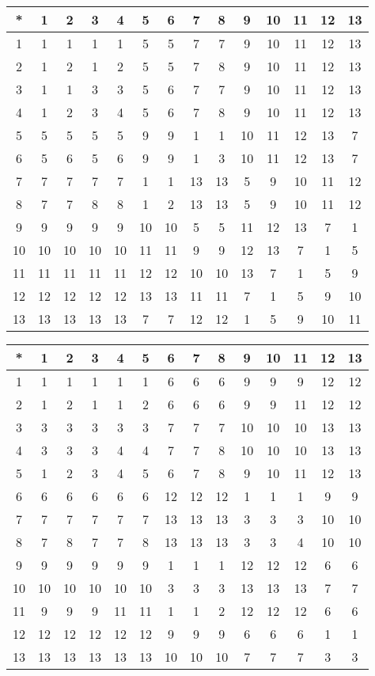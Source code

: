 \begin{tabular}[t]{c|ccccccccccccc}
*&1&2&3&4&5&6&7&8&9&10&11&12&13 \\ \hline
    1&1&1&1&1&5&5&7&7&9&10&11&12&13 \\
    2&1&2&1&2&5&5&7&8&9&10&11&12&13 \\
    3&1&1&3&3&5&6&7&7&9&10&11&12&13 \\
    4&1&2&3&4&5&6&7&8&9&10&11&12&13 \\
    5&5&5&5&5&9&9&1&1&10&11&12&13&7 \\
    6&5&6&5&6&9&9&1&3&10&11&12&13&7 \\
    7&7&7&7&7&1&1&13&13&5&9&10&11&12 \\
    8&7&7&8&8&1&2&13&13&5&9&10&11&12 \\
    9&9&9&9&9&10&10&5&5&11&12&13&7&1 \\
    10&10&10&10&10&11&11&9&9&12&13&7&1&5 \\
    11&11&11&11&11&12&12&10&10&13&7&1&5&9 \\
    12&12&12&12&12&13&13&11&11&7&1&5&9&10 \\
    13&13&13&13&13&7&7&12&12&1&5&9&10&11 
\end{tabular}


\begin{tabular}[t]{c|ccccccccccccc}
*&1&2&3&4&5&6&7&8&9&10&11&12&13 \\ \hline
    1&1&1&1&1&1&6&6&6&9&9&9&12&12 \\
    2&1&2&1&1&2&6&6&6&9&9&11&12&12 \\
    3&3&3&3&3&3&7&7&7&10&10&10&13&13 \\
    4&3&3&3&4&4&7&7&8&10&10&10&13&13 \\
    5&1&2&3&4&5&6&7&8&9&10&11&12&13 \\
    6&6&6&6&6&6&12&12&12&1&1&1&9&9 \\
    7&7&7&7&7&7&13&13&13&3&3&3&10&10 \\
    8&7&8&7&7&8&13&13&13&3&3&4&10&10 \\
    9&9&9&9&9&9&1&1&1&12&12&12&6&6 \\
    10&10&10&10&10&10&3&3&3&13&13&13&7&7 \\
    11&9&9&9&11&11&1&1&2&12&12&12&6&6 \\
    12&12&12&12&12&12&9&9&9&6&6&6&1&1 \\
    13&13&13&13&13&13&10&10&10&7&7&7&3&3 
\end{tabular}


